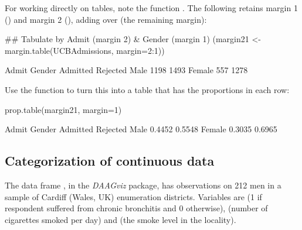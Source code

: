 For working directly on tables, note the function .
The following retains margin 1 () and margin 2 (),
adding over  (the remaining margin):
\begin{Schunk}
\begin{Sinput}
## Tabulate by Admit (margin 2) & Gender (margin 1)
(margin21 <- margin.table(UCBAdmissions,
                          margin=2:1))
\end{Sinput}
\begin{Soutput}
        Admit
Gender   Admitted Rejected
  Male       1198     1493
  Female      557     1278
\end{Soutput}
\end{Schunk}

Use the function  to turn this into a table
that has the proportions in each row:
\begin{Schunk}
\begin{Sinput}
prop.table(margin21, margin=1)
\end{Sinput}
\begin{Soutput}
        Admit
Gender   Admitted Rejected
  Male     0.4452   0.5548
  Female   0.3035   0.6965
\end{Soutput}
\end{Schunk}

\subsection{Categorization of continuous data}\label{ss:cat-cig}
The data frame , in the \textit{DAAGviz} package,
has observations on 212 men in a sample of Cardiff (Wales, UK)
enumeration districts. Variables are  (1 if respondent
suffered from chronic bronchitis and 0 otherwise),  (number
of cigarettes smoked per day) and  (the smoke level in the
locality).

